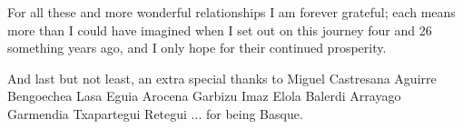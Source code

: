 For all these and more wonderful relationships I am forever grateful; each means more than I could have imagined when I set out on this journey four and 26 something years ago, and I only hope for their continued prosperity.

And last but not least, an extra special thanks to Miguel Castresana Aguirre Bengoechea Lasa Eguia Arocena Garbizu Imaz Elola Balerdi Arrayago Garmendia Txapartegui Retegui  ... for being Basque.



